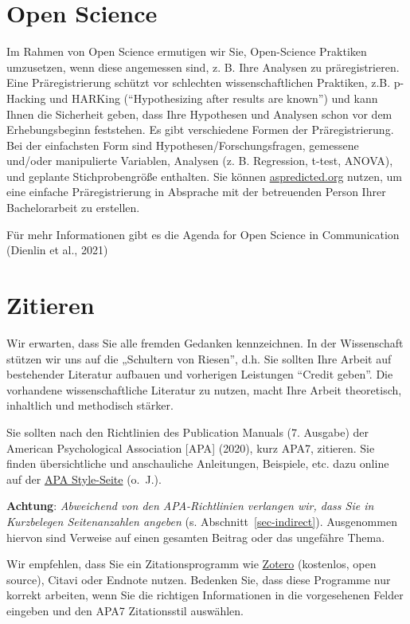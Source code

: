 \documentclass[
  letterpaper,
  DIV=11]{scrreprt}
\begin{document}
\hypertarget{open-science}{%
\chapter{Open Science}\label{open-science}}

Im Rahmen von Open Science ermutigen wir Sie, Open-Science Praktiken
umzusetzen, wenn diese angemessen sind, z. B. Ihre Analysen zu
präregistrieren. Eine Präregistrierung schützt vor schlechten
wissenschaftlichen Praktiken, z.B. p-Hacking und HARKing
(``Hypothesizing after results are known'') und kann Ihnen die
Sicherheit geben, dass Ihre Hypothesen und Analysen schon vor dem
Erhebungsbeginn feststehen. Es gibt verschiedene Formen der
Präregistrierung. Bei der einfachsten Form sind
Hypothesen/Forschungsfragen, gemessene und/oder manipulierte Variablen,
Analysen (z. B. Regression, t-test, ANOVA), und geplante
Stichprobengröße enthalten. Sie können
\href{https://aspredicted.org}{aspredicted.org} nutzen, um eine einfache
Präregistrierung in Absprache mit der betreuenden Person Ihrer
Bachelorarbeit zu erstellen.

Für mehr Informationen gibt es die Agenda for Open Science in
Communication (Dienlin et al., 2021)

\hypertarget{zitieren}{%
\chapter{Zitieren}\label{zitieren}}

Wir erwarten, dass Sie alle fremden Gedanken kennzeichnen. In der
Wissenschaft stützen wir uns auf die „Schultern von Riesen'', d.h. Sie
sollten Ihre Arbeit auf bestehender Literatur aufbauen und vorherigen
Leistungen ``Credit geben''. Die vorhandene wissenschaftliche Literatur
zu nutzen, macht Ihre Arbeit theoretisch, inhaltlich und methodisch
stärker.

Sie sollten nach den Richtlinien des Publication Manuals (7. Ausgabe)
der American Psychological Association {[}APA{]} (2020), kurz APA7,
zitieren. Sie finden übersichtliche und anschauliche Anleitungen,
Beispiele, etc. dazu online auf der \href{https://apastyle.apa.org/}{APA
Style-Seite} (o.~J.).

\textbf{Achtung}: \emph{Abweichend von den APA-Richtlinien verlangen
wir, dass Sie in Kurzbelegen Seitenanzahlen angeben} (s.
Abschnitt~\ref{sec-indirect}). Ausgenommen hiervon sind Verweise auf
einen gesamten Beitrag oder das ungefähre Thema.

Wir empfehlen, dass Sie ein Zitationsprogramm wie
\href{https://www.zotero.org/}{Zotero} (kostenlos, open source), Citavi
oder Endnote nutzen. Bedenken Sie, dass diese Programme nur korrekt
arbeiten, wenn Sie die richtigen Informationen in die vorgesehenen
Felder eingeben und den APA7 Zitationsstil auswählen.
\end{document}
